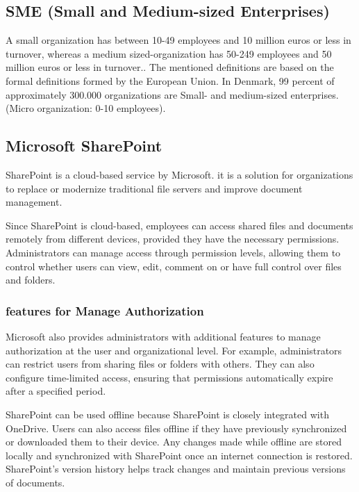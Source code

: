 \documentclass[12pt,a4paper]{article}
\begin{document}
\subsection{SME (Small and Medium-sized Enterprises)}
A small organization has between 10-49 employees and 10 million euros or less in turnover, whereas a medium sized-organization has 50-249 employees and 50 million euros or less in turnover.\cite{e-conomic}. The mentioned definitions are based on the formal definitions formed by the European Union.\cite{e-conomic} In Denmark, 99 percent of approximately 300.000 organizations are Small- and medium-sized enterprises.\cite{e-conomic}
(Micro organization: 0-10 employees).\cite{e-conomic} 

\subsection{Microsoft SharePoint}
SharePoint is a cloud-based service by Microsoft. it is a solution for organizations to replace or modernize traditional file servers and improve document management.
 
Since SharePoint is cloud-based, employees can access shared files and documents remotely from different devices, provided they have the necessary permissions. Administrators can manage access through permission levels, allowing them to control whether users can view, edit, comment on or have full control over files and folders.

\subsubsection{features for Manage Authorization}
Microsoft also provides administrators with additional features to manage authorization at the user and organizational level. For example, administrators can restrict users from sharing files or folders with others.\cite{sharePoint_sharing} They can also configure time-limited access, ensuring that permissions automatically expire after a specified period.\cite{sharepoint}

SharePoint can be used offline because SharePoint is closely integrated with OneDrive. Users can also access files offline if they have previously synchronized or downloaded them to their device. Any changes made while offline are stored locally and synchronized with SharePoint once an internet connection is restored. SharePoint's version history helps track changes and maintain previous versions of documents.\cite{sharepoint}
\end{document}

